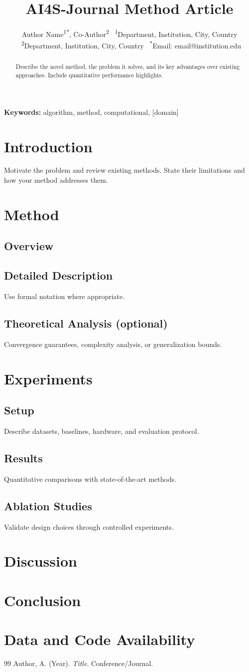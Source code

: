 \documentclass[12pt,a4paper]{article}
\title{\textbf{\textcolor{ai4sgold}{AI4S-Journal} Method Article}}
\author{Author Name\textsuperscript{1*}, Co-Author\textsuperscript{2} \
\textsuperscript{1}Department, Institution, City, Country \
\textsuperscript{2}Department, Institution, City, Country \
\textsuperscript{*}Email: email@institution.edu}
\date{}
\begin{document}
\maketitle

\begin{abstract}
Describe the novel method, the problem it solves, and its key advantages
over existing approaches. Include quantitative performance highlights.
\end{abstract}
\noindent\textbf{Keywords:} algorithm, method, computational, [domain]

\section{Introduction}
Motivate the problem and review existing methods. State their limitations
and how your method addresses them.

\section{Method}
\subsection{Overview}
\subsection{Detailed Description}
Use formal notation where appropriate.

\subsection{Theoretical Analysis (optional)}
Convergence guarantees, complexity analysis, or generalization bounds.

\section{Experiments}
\subsection{Setup}
Describe datasets, baselines, hardware, and evaluation protocol.
\subsection{Results}
Quantitative comparisons with state-of-the-art methods.
\subsection{Ablation Studies}
Validate design choices through controlled experiments.

\section{Discussion}
\section{Conclusion}
\section*{Data and Code Availability}


\begin{thebibliography}{99}
 Author, A. (Year). \textit{Title}. Conference/Journal.
\end{thebibliography}
\end{document}
